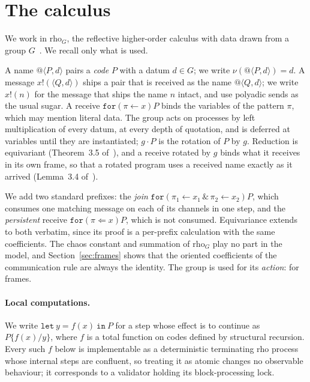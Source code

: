 \documentclass[11pt]{article}
\makeatletter
\theoremstyle{definition}
\theoremstyle{remark}
\newcommand{\calc}{\mathrm{rho}_G}
\newcommand{\rcv}[3]{\mathtt{for}(#1 \leftarrow #2)#3}
\newcommand{\prcv}[3]{\mathtt{for}(#1 \Leftarrow #2)#3}
\newcommand{\jrcv}[5]{\mathtt{for}(#1 \leftarrow #2 \,\&\, #3 \leftarrow #4)#5}
\newcommand{\snd}[2]{#1!(#2)}
\newcommand{\qn}[2]{@\langle #1, #2\rangle}
\newcommand{\act}[2]{#1\cdot #2}
\makeatother
\begin{document}
\section{The calculus}\label{sec:calculus}

We work in $\calc$, the reflective higher-order calculus with data drawn from a
group $G$~\cite{oriented}. We recall only what is used.

A name $\qn{P}{d}$ pairs a \emph{code} $P$ with a datum $d\in G$; we write
$\nu(\qn{P}{d})=d$. A message $\snd{x}{\langle Q,d\rangle}$ ships a pair that
is received as the name $\qn{Q}{d}$; we write $\snd{x}{n}$ for the message that
ships the name $n$ intact, and use polyadic sends as the usual sugar. A receive
$\rcv{\pi}{x}{P}$ binds the variables of the pattern $\pi$, which may mention
literal data. The group acts on processes by left multiplication of every
datum, at every depth of quotation, and is deferred at variables until they
are instantiated; $\act{g}{P}$ is the rotation of $P$ by $g$. Reduction is
equivariant (Theorem~3.5 of~\cite{oriented}), and a receive rotated by $g$
binds what it receives in its own frame, so that a rotated program uses a
received name exactly as it arrived (Lemma~3.4 of~\cite{oriented}).

We add two standard prefixes: the \emph{join} $\jrcv{\pi_1}{x_1}{\pi_2}{x_2}{P}$,
which consumes one matching message on each of its channels in one step, and
the \emph{persistent} receive $\prcv{\pi}{x}{P}$, which is not consumed.
Equivariance extends to both verbatim, since its proof is a per-prefix
calculation with the same coefficients. The chaos constant and summation of
$\calc$ play no part in the model, and Section~\ref{sec:frames} shows that the
oriented coefficients of the communication rule are always the identity. The
group is used for its \emph{action}: for frames.

\paragraph{Local computations.}
We write $\mathtt{let}\ y = f(x)\ \mathtt{in}\ P$ for a step whose effect is to
continue as $P\{f(x)/y\}$, where $f$ is a total function on codes defined by
structural recursion. Every such $f$ below is implementable as a deterministic
terminating rho process whose internal steps are confluent, so treating it as
atomic changes no observable behaviour; it corresponds to a validator holding
its block-processing lock.
\end{document}
